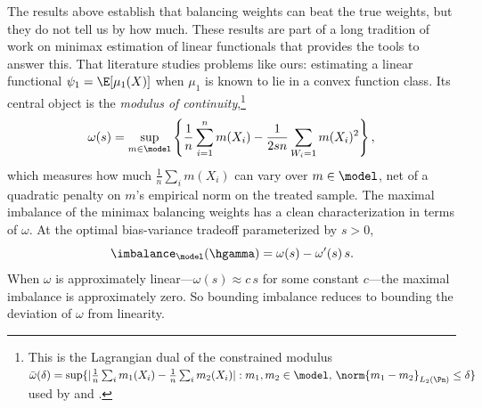 
The results above establish that balancing weights can beat the true weights, but they do not tell us by how much. These results are part of a long tradition of work on minimax estimation of linear functionals \citep{ibragimov1985nonparametric, donoho1991geometrizing, donoho1994statistical, armstrong2018optimal} that provides the tools to answer this. That literature studies problems like ours: estimating a linear functional $\psi_1 = \E[\mu_1(X)]$ when $\mu_1$ is known to lie in a convex function class. Its central object is the \emph{modulus of continuity},\footnote{This is the Lagrangian dual of the constrained modulus $\bar\omega(\delta) = \sup\{|\frac{1}{n}\sum_i m_1(X_i) - \frac{1}{n}\sum_i m_2(X_i)| : m_1, m_2 \in \model,\, \norm{m_1 - m_2}_{L_2(\Pn)} \le \delta\}$ used by \citet{donoho1994statistical} and \citet{armstrong2018optimal}.}
\begin{equation}
\label{eq:modulus-of-continuity}
\omega(s) = \sup_{m \in \model} \left\{ \frac{1}{n}\sum_{i=1}^n m(X_i) - \frac{1}{2sn} \sum_{W_i=1} m(X_i)^2 \right\},
\end{equation}
which measures how much $\frac{1}{n}\sum_i m(X_i)$ can vary over $m \in \model$, net of a quadratic penalty on $m$'s empirical norm on the treated sample. The maximal imbalance of the minimax balancing weights has a clean characterization in terms of $\omega$. At the optimal bias-variance tradeoff parameterized by $s > 0$,
\begin{equation}
\label{eq:donoho-liu-bias}
\imbalance_\model(\hgamma) = \omega(s) - \omega'(s)\,s.
\end{equation}
When $\omega$ is approximately linear---$\omega(s) \approx c\,s$ for some constant $c$---the maximal imbalance is approximately zero. So bounding imbalance reduces to bounding the deviation of $\omega$ from linearity.
